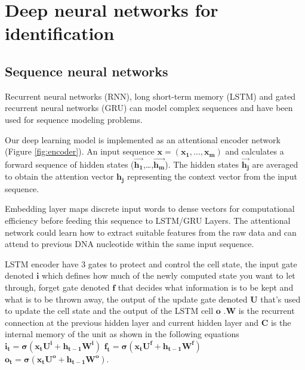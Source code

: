 
\chapter{Deep neural networks for identification} %

\label{Chapter3} %





\section{Sequence neural networks}

Recurrent neural networks (RNN), long short-term memory (LSTM) \cite{hochreiter1997long} and gated recurrent neural networks (GRU) \cite{chung2014empirical} can model complex sequences and have been used for sequence modeling problems.

Our deep learning model is implemented as an attentional encoder network (Figure \ref{fig:encoder}). An input sequence  $\mathbf{x = (x_{1} , \ldots{} , x_{m} )}$  and calculates a forward sequence of hidden states  ($\mathbf{\overrightarrow{h_{1}}}$,\ldots{},$\mathbf{ \overrightarrow{h_{m}}}$). The hidden states $\mathbf{\overrightarrow{h_{j}}}$  are averaged to obtain the attention vector $\mathbf{h_{j}}$ representing the context vector from the input sequence.

Embedding layer maps discrete input words to dense vectors for computational efficiency before feeding this sequence to LSTM/GRU Layers. The attentional network could learn how to extract suitable features from the raw data and can attend to previous DNA nucleotide within the same input sequence. 

LSTM encoder have 3 gates to protect and control the cell state, the input gate denoted $\mathbf{i}$ which defines how much of the newly computed state you want to let through, forget gate denoted $\mathbf{f}$ that decides what information is to be kept and what is to be thrown away,  the output of the update gate denoted $\mathbf{U}$ that's used to update the cell state and the output of the LSTM cell $\mathbf{o}$ .$\mathbf{W}$ is the recurrent connection at the previous hidden layer and current hidden layer and $\mathbf{C}$ is the internal memory of the unit  as shown in the following equations \newline
$\mathbf{i_{t}=\sigma(x_{t}U^i + h_{t-1}W^i)}$ \newline
$\mathbf{f_{t}=\sigma(x_{t}U^f + h_{t-1}W^f)}$ \newline
$\mathbf{o_{t}=\sigma(x_{t}U^o + h_{t-1}W^o)}$. 

